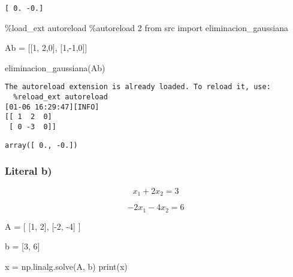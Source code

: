 \documentclass[
  letterpaper,
  DIV=11,
  numbers=noendperiod]{scrartcl}
\newenvironment{Shaded}{\begin{snugshade}}{\end{snugshade}}
\newcommand{\BuiltInTok}[1]{\textcolor[rgb]{0.00,0.23,0.31}{#1}}
\newcommand{\DecValTok}[1]{\textcolor[rgb]{0.68,0.00,0.00}{#1}}
\newcommand{\ImportTok}[1]{\textcolor[rgb]{0.00,0.46,0.62}{#1}}
\newcommand{\NormalTok}[1]{\textcolor[rgb]{0.00,0.23,0.31}{#1}}
\newcommand{\OperatorTok}[1]{\textcolor[rgb]{0.37,0.37,0.37}{#1}}
\begin{document}
\begin{verbatim}
[ 0. -0.]
\end{verbatim}

\begin{Shaded}
\begin{Highlighting}[]
\OperatorTok{\%}\NormalTok{load\_ext autoreload}
\OperatorTok{\%}\NormalTok{autoreload }\DecValTok{2}
\ImportTok{from}\NormalTok{ src }\ImportTok{import}\NormalTok{ eliminacion\_gaussiana}

\NormalTok{Ab }\OperatorTok{=}\NormalTok{ [[}\DecValTok{1}\NormalTok{, }\DecValTok{2}\NormalTok{,}\DecValTok{0}\NormalTok{], [}\DecValTok{1}\NormalTok{,}\OperatorTok{{-}}\DecValTok{1}\NormalTok{,}\DecValTok{0}\NormalTok{]]}

\NormalTok{eliminacion\_gaussiana(Ab)}
\end{Highlighting}
\end{Shaded}

\begin{verbatim}
The autoreload extension is already loaded. To reload it, use:
  %reload_ext autoreload
[01-06 16:29:47][INFO] 
[[ 1  2  0]
 [ 0 -3  0]]
\end{verbatim}

\begin{verbatim}
array([ 0., -0.])
\end{verbatim}

\subsubsection{Literal b)}\label{literal-b}

\[x_1 + 2x_2 = 3\]

\[-2x_1 - 4x_2 = 6\]

\begin{Shaded}
\begin{Highlighting}[]

\NormalTok{A }\OperatorTok{=}\NormalTok{ [}
\NormalTok{    [}\DecValTok{1}\NormalTok{, }\DecValTok{2}\NormalTok{],}
\NormalTok{    [}\OperatorTok{{-}}\DecValTok{2}\NormalTok{, }\OperatorTok{{-}}\DecValTok{4}\NormalTok{]}
\NormalTok{]}

\NormalTok{b }\OperatorTok{=}\NormalTok{ [}\DecValTok{3}\NormalTok{, }\DecValTok{6}\NormalTok{]}

\NormalTok{x }\OperatorTok{=}\NormalTok{ np.linalg.solve(A, b)}
\BuiltInTok{print}\NormalTok{(x)}
\end{Highlighting}
\end{Shaded}
\end{document}
